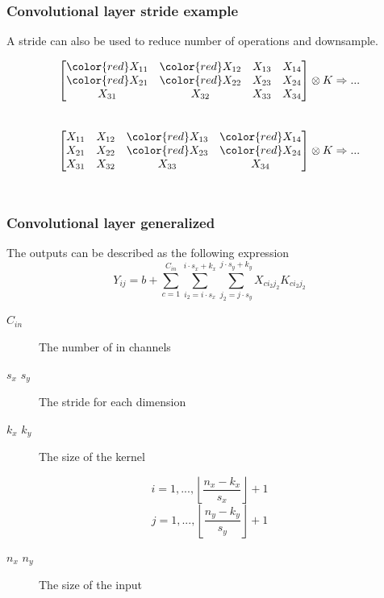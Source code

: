 \documentclass{beamer}
\begin{document}
\begin{frame}
    \frametitle{Convolutional layer stride example}
    A stride can also be used to reduce number of operations and downsample.

    \begin{figure}
        \centering
        $$\begin{bmatrix}
            \color{red} X_{11} & \color{red} X_{12} & X_{13} & X_{14} \\
            \color{red} X_{21} & \color{red} X_{22} & X_{23} & X_{24} \\
            X_{31} & X_{32} & X_{33} & X_{34}
        \end{bmatrix} \otimes K \Rightarrow ...$$\\
        $$\begin{bmatrix}
            X_{11} & X_{12} & \color{red} X_{13} & \color{red} X_{14} \\
            X_{21} & X_{22} & \color{red} X_{23} & \color{red} X_{24} \\
            X_{31} & X_{32} & X_{33} & X_{34}
        \end{bmatrix} \otimes K \Rightarrow ...$$\\
        \label{fig:conv_operation_with_stride}
    \end{figure}
\end{frame}

\begin{frame}
    \frametitle{Convolutional layer generalized}
    The outputs can be described as the following expression
    $$Y_{ij} = b + \sum^{C_{in}}_{c = 1} \sum^{i \cdot s_x + k_x}_{i_2 = i \cdot s_x} \sum^{j \cdot s_y + k_y}_{j_2 = j \cdot s_y} X_{ci_2j_2} K_{ci_2j_2} $$
    \pause

    \begin{description}
        \item[$C_{in}$] The number of in channels
        \item[$s_x$ $s_y$] The stride for each dimension
        \item[$k_x$ $k_y$] The size of the kernel
    \end{description}
    \pause

    $$i = 1, ..., \left\lfloor\frac{n_x - k_x}{s_x}\right\rfloor + 1$$
    $$j = 1, ..., \left\lfloor\frac{n_y - k_y}{s_y}\right\rfloor + 1$$

    \begin{description}
        \item[$n_x$ $n_y$] The size of the input
    \end{description}
\end{frame}
\end{document}
